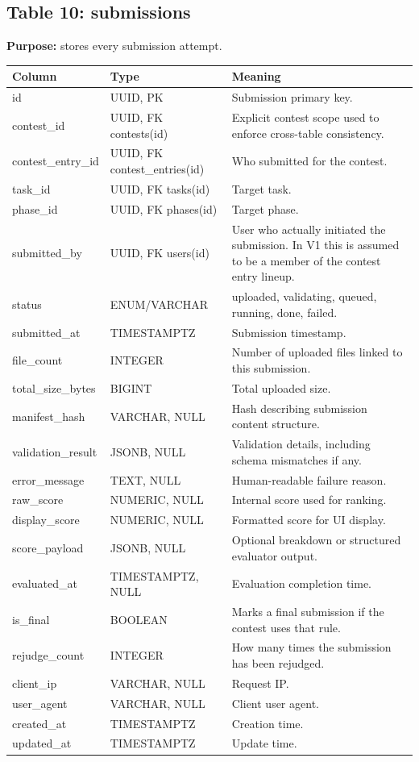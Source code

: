 \documentclass[11pt,a4paper]{article}
\begin{document}
\subsection{Table 10: submissions}
\textbf{Purpose:} stores every submission attempt.

\begin{longtable}{>{\raggedright\arraybackslash}p{} >{\raggedright\arraybackslash}p{} >{\raggedright\arraybackslash}p{}}
\toprule
\textbf{Column} & \textbf{Type} & \textbf{Meaning} \\
\midrule
id & UUID, PK & Submission primary key. \\
contest\_id & UUID, FK contests(id) & Explicit contest scope used to enforce cross-table consistency. \\
contest\_entry\_id & UUID, FK contest\_entries(id) & Who submitted for the contest. \\
task\_id & UUID, FK tasks(id) & Target task. \\
phase\_id & UUID, FK phases(id) & Target phase. \\
submitted\_by & UUID, FK users(id) & User who actually initiated the submission. In V1 this is assumed to be a member of the contest entry lineup. \\
status & ENUM/VARCHAR & uploaded, validating, queued, running, done, failed. \\
submitted\_at & TIMESTAMPTZ & Submission timestamp. \\
file\_count & INTEGER & Number of uploaded files linked to this submission. \\
total\_size\_bytes & BIGINT & Total uploaded size. \\
manifest\_hash & VARCHAR, NULL & Hash describing submission content structure. \\
validation\_result & JSONB, NULL & Validation details, including schema mismatches if any. \\
error\_message & TEXT, NULL & Human-readable failure reason. \\
raw\_score & NUMERIC, NULL & Internal score used for ranking. \\
display\_score & NUMERIC, NULL & Formatted score for UI display. \\
score\_payload & JSONB, NULL & Optional breakdown or structured evaluator output. \\
evaluated\_at & TIMESTAMPTZ, NULL & Evaluation completion time. \\
is\_final & BOOLEAN & Marks a final submission if the contest uses that rule. \\
rejudge\_count & INTEGER & How many times the submission has been rejudged. \\
client\_ip & VARCHAR, NULL & Request IP. \\
user\_agent & VARCHAR, NULL & Client user agent. \\
created\_at & TIMESTAMPTZ & Creation time. \\
updated\_at & TIMESTAMPTZ & Update time. \\
\bottomrule
\end{longtable}
\end{document}

